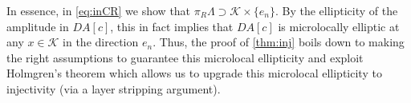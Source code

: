 \documentclass[
	fontsize=11pt, 
	twoside=false, 
	abstract=true, 
	a4paper,
]{scrartcl}
\newcommand{\norm}[1]{\left\lVert#1\right\rVert}
\begin{document}
\begin{remark}
In essence, in \cref{eq:inCR} we show that $\pi_R\Lambda \supset \mathcal{K} \times \{e_n\}$. By the ellipticity of the amplitude in $DA[c]$, this in fact implies that $DA[c]$ is microlocally elliptic at any $x\in\mathcal{K}$ in the direction $e_n$. Thus, the proof of \cref{thm:inj} boils down to making the right assumptions to guarantee this microlocal ellipticity and exploit Holmgren's theorem which allows us to upgrade this microlocal ellipticity to injectivity (via a layer stripping argument). 
\end{remark}

\end{document}
